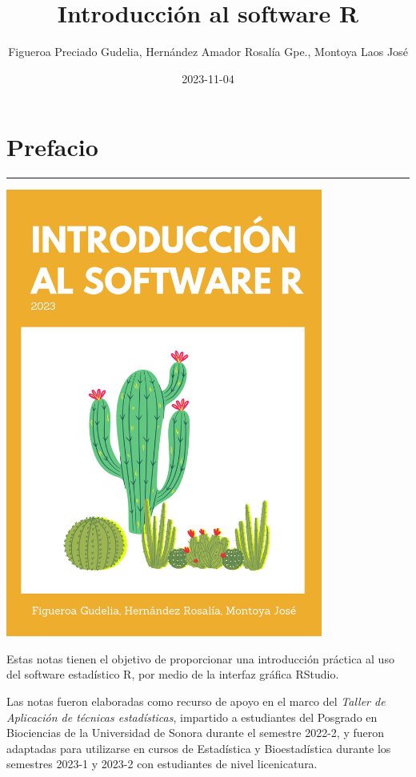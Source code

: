 \documentclass[
]{book}
\title{Introducción al software R}
\author{Figueroa Preciado Gudelia,
Hernández Amador Rosalía Gpe., Montoya Laos José}
\date{2023-11-04}
\begin{document}
\maketitle

{
\setcounter{tocdepth}{1}
\tableofcontents
}
\hypertarget{prefacio}{%
\chapter*{Prefacio}\label{prefacio}}

\begin{center}\rule{0.5\linewidth}{0.5pt}\end{center}

\includegraphics[width=4.10417in,height=\textheight]{portada.png}

Estas notas tienen el objetivo de proporcionar una introducción práctica al uso del software estadístico R, por medio de la interfaz gráfica RStudio.

Las notas fueron elaboradas como recurso de apoyo en el marco del \emph{Taller de Aplicación de técnicas estadísticas}, impartido a estudiantes del Posgrado en Biociencias de la Universidad de Sonora durante el semestre 2022-2, y fueron adaptadas para utilizarse en cursos de Estadística y Bioestadística durante los semestres 2023-1 y 2023-2 con estudiantes de nivel licenicatura.
\end{document}
